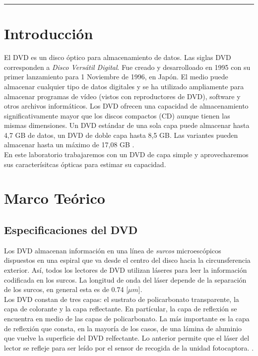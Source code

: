\documentclass[10pt,a4paper]{article}
\begin{document}
	\begin{center}
		\textcolor{pinegreen}{\rule{150mm}{0.8mm}}
	\end{center}
	
	\begin{multicols}{2}
		\section{Introducción}
			El DVD es un disco óptico para almacenamiento de datos. Las siglas DVD corresponden a \emph{Disco Versátil Digital}. Fue creado y desarrolloado en 1995 con su primer lanzamiento para 1 Noviembre de 1996, en Japón. El medio puede almacenar cualquier tipo de datos digitales y se ha utilizado ampliamente para almacenar programas de vídeo (vistos con reproductores de DVD), software y otros archivos informáticos. Los DVD ofrecen una capacidad de almacenamiento significativamente mayor que los discos compactos (CD) aunque tienen las mismas dimensiones. Un DVD estándar de una sola capa puede almacenar hasta 4,7 GB de datos, un DVD de doble capa hasta 8,5 GB. Las variantes pueden almacenar hasta un máximo de 17,08 GB \cite{wikiDVD}.\\
			
			En este laboratorio trabajaremos con un DVD de capa simple y aprovecharemos sus caracterísitcas ópticas para estimar su capacidad.
		\section{Marco Teórico}
		\subsection*{Especificaciones del DVD}
		Los DVD almacenan información en una línea de \emph{surcos} microescópicos dispuestos en una espiral que va desde el centro del disco hacia la circunsferencia exterior. Así, todos los lectores de DVD utilizan láseres para leer la información codificada en los surcos. La longitud de onda del láser depende de la separación de los surcos, en general esta es de 0.74 [$\mu m$].\\
		
		Los DVD constan de tres capas: el sustrato de policarbonato transparente, la capa de colorante y la capa reflectante. En partícular, la capa de reflexión se encuentra en medio de las capas de policarbonato. La más importante es la capa de reflexión que consta, en la mayoría de los casos, de una lámina de aluminio que vuelve la superficie del DVD relfectante. Lo anterior permite que el láser del lector se refleje para ser leído por el sensor de recogida de la unidad fotocaptora. \cite{especificaciones_DVD}.

\end{multicols}
\end{document}
